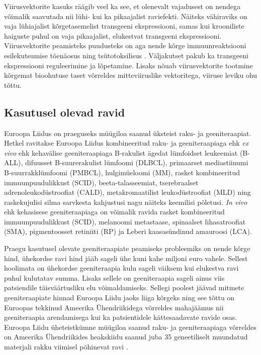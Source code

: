 \documentclass{trkut}%
\begin{document}
Viirusvektorite kasuks räägib veel ka see, et olenevalt vajadusest on nendega võimalik saavutada nii lühi- kui ka pikaajalist raviefekti. Näiteks vähiraviks on vaja lühiajalist kõrgetasemelist transgeeni ekspressiooni, samas kui krooniliste haiguste puhul on vaja pikaajalist, elukestvat transgeeni ekspressiooni. Viirusvektorite peamisteks puudusteks on aga nende kõrge immuunreaktsiooni esilekutsumise tõenäosus ning tsütotoksilisus \parencite{genviisid}. Väljakutset pakub ka transgeeni ekspressiooni reguleerimine ja lõpetamine. Lisaks nõuab viirusvektorite tootmine kõrgemat bioohutuse taset võrreldes mitteviiruslike vektoritega, viiruse leviku ohu tõttu. \parencite{viirusvektoriteravi}

\subsection{Kasutusel olevad ravid}

Euroopa Liidus on praeguseks müügiloa saanud üksteist raku- ja geeniteraapiat. Hetkel ravitakse Euroopa Liidus kombineeritud raku- ja geeniteraapiaga ehk \textit{ex vivo} ehk kehavälise geeniteraapiaga B-rakulist ägedat lümfoidset leukeemiat (B-ALL), difuusset B-suurerakulist lümfoomi (DLBCL), primaarset mediastiinumi B-suurrakklümfoomi (PMBCL), hulgimüeloomi (MM), rasket kombineeritud immuunpuudulikkust (SCID), beeta-talasseemiat, tserebraalset adrenoleukodüstroofiat (CALD), metakromaatilist leukodüstroofiat (MLD) ning raskekujulisi silma sarvkesta kahjustusi nagu näiteks keemilisi põletusi. \textit{In vivo} ehk kehasisese geeniteraapiaga on võimalik ravida rasket kombineeritud immuunpuudulikkust (SCID), melanoomi metastaase, spinaalset lihasatroofiat (SMA), pigmentoosset retiniiti (RP) ja Leberi kaasasündinud amauroosi (LCA). \parencite{genpraegu}

Praegu kasutusel olevate geeniteraapiate peamiseks probleemiks on nende kõrge hind, ühekordse ravi hind jääb sageli ühe kuni kahe miljoni euro vahele. Sellest hoolimata on ühekordse geeniteraapia kulu sageli väiksem kui elukestva ravi puhul kulutatav summa. Lisaks sellele on geeniteraapia sageli ainus viis patsiendile täisväärtusliku elu võimaldamiseks. Sellegi poolest jäävad mitmete geeniteraapiate hinnad Euroopa Liidu jaoks liiga kõrgeks ning see tõttu on Euroopas tekkinud Ameerika Ühendriikidega võrreldes mahajäämus nii geeniteraapia arendamisega kui ka patsientidele kättesaadavate ravide osas.\parencite{kallis} Euroopa Liidu üheteistkümne müügiloa saanud raku- ja geeniteraapiaga võrreldes on Ameerika Ühendriikides heakskiidu saanud juba 35 geneetiliselt muundatud materjali rakku viimisel põhinevat ravi \parencite{usa}.
\end{document}
